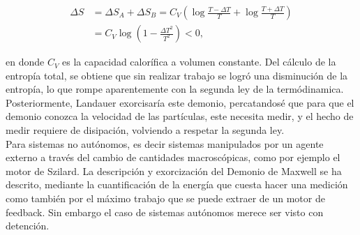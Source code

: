 \begin{align*}
    \Delta S & = \Delta S_{A} + \Delta S_{B} = C_{V}\left( \log \frac{T-\Delta T}{T} + \log \frac{T+\Delta T}{T} \right) \\
       & =  C_{V} \log \left( 1 - \frac{\Delta T^{2}}{T^{2}}  \right) < 0,
\end{align*}

en donde $C_{V}$ es la capacidad calorífica a volumen constante. Del cálculo de la entropía total, se obtiene que sin realizar trabajo se logró una disminución de la entropía, lo que rompe aparentemente con la segunda ley de la termódinamica. Posteriormente, Landauer exorcisaría este demonio, percatandosé que para que el demonio conozca la velocidad de las partículas, este necesita medir, y el hecho de medir requiere de  disipación, volviendo a respetar la segunda ley\cite{Landauer_1961}. \\
Para sistemas no autónomos, es decir sistemas manipulados por un agente externo a través del cambio de cantidades macroscópicas, como por ejemplo el motor de Szilard\cite{szilard1964decrease}. La descripción y exorcización del Demonio de Maxwell se ha descrito, mediante la cuantificación de la energía que cuesta hacer una medición como también por el máximo trabajo que se puede extraer de un motor de feedback\cite{maruyama2009colloquium,sagawa2008second}. Sin embargo el caso de sistemas autónomos merece ser visto con detención.



